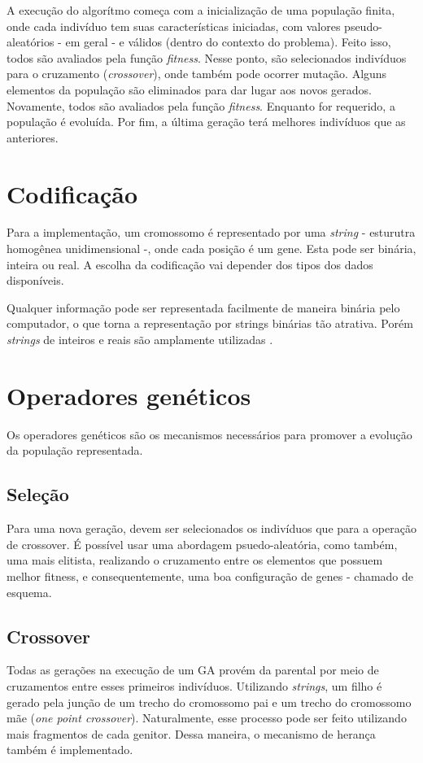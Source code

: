 A execução do algorítmo começa com a inicialização de uma população finita, 
onde cada indivíduo tem suas características iniciadas, com valores 
pseudo-aleatórios - em geral - e válidos (dentro do contexto do problema). 
Feito isso, todos são avaliados pela função {\it fitness}. Nesse ponto, são 
selecionados indivíduos para o cruzamento ({\it crossover}), onde também pode 
ocorrer mutação. Alguns elementos da população são eliminados para dar lugar 
aos novos gerados. Novamente, todos são avaliados pela função {\it fitness}. 
Enquanto for requerido, a população é evoluída. Por fim, a última geração terá
melhores indivíduos que as anteriores.

\section{Codificação}
Para a implementação, um cromossomo é representado por uma {\it string} - esturutra
homogênea unidimensional -, onde cada posição é um gene. Esta pode ser binária, 
inteira ou real. A escolha da codificação vai depender dos tipos dos dados
disponíveis.

Qualquer informação pode ser representada facilmente de maneira binária pelo
computador, o que torna a representação por strings binárias tão atrativa.
Porém {\it strings} de inteiros e reais são amplamente utilizadas \cite{survey_of_evol_algorithms}.

\section{Operadores genéticos}
Os operadores genéticos são os mecanismos necessários para promover a evolução
da população representada. 

\subsection{Seleção}
Para uma nova geração, devem ser selecionados os indivíduos que para a operação
de crossover. É possível usar uma abordagem psuedo-aleatória, como também, uma
mais elitista, realizando o cruzamento entre os elementos que possuem melhor
fitness, e consequentemente, uma boa configuração de genes - chamado de esquema.

\subsection{Crossover}
Todas as gerações na execução de um GA provém da parental por meio de cruzamentos
entre esses primeiros indivíduos. Utilizando {\it strings}, um filho é gerado pela
junção de um trecho do cromossomo pai e um trecho do cromossomo mãe ({\it one 
point crossover}). Naturalmente, esse processo pode ser feito utilizando mais 
fragmentos de cada genitor. Dessa maneira, o mecanismo de herança também é 
implementado.

